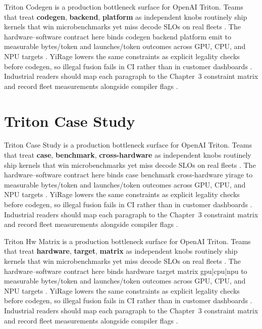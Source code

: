 Triton Codegen is a production bottleneck surface for OpenAI Triton. Teams that treat \textbf{codegen}, \textbf{backend}, \textbf{platform} as independent knobs routinely ship kernels that win microbenchmarks yet miss decode SLOs on real fleets \citep{nvidia2022hopper,amd2024aie}. The hardware--software contract here binds codegen backend platform emit to measurable bytes/token and launches/token outcomes across GPU, CPU, and NPU targets \citep{semianalysis2024tma,dlbook}. YiRage lowers the same constraints as explicit legality checks before codegen, so illegal fusion fails in CI rather than in customer dashboards \citep{amd2024xdna,dao2022flashattention}. Industrial readers should map each paragraph to the Chapter~3 constraint matrix and record fleet measurements alongside compiler flags \citep{amd2024aie,kwon2023vllm}.

\section{Triton Case Study}
\label{sec:triton_case_study}

Triton Case Study is a production bottleneck surface for OpenAI Triton. Teams that treat \textbf{case}, \textbf{benchmark}, \textbf{cross-hardware} as independent knobs routinely ship kernels that win microbenchmarks yet miss decode SLOs on real fleets \citep{semianalysis2024tma,dlbook}. The hardware--software contract here binds case benchmark cross-hardware yirage to measurable bytes/token and launches/token outcomes across GPU, CPU, and NPU targets \citep{amd2024xdna,dao2022flashattention}. YiRage lowers the same constraints as explicit legality checks before codegen, so illegal fusion fails in CI rather than in customer dashboards \citep{amd2024aie,kwon2023vllm}. Industrial readers should map each paragraph to the Chapter~3 constraint matrix and record fleet measurements alongside compiler flags \citep{dlbook,nvidia2024cudagraphs}.

Triton Hw Matrix is a production bottleneck surface for OpenAI Triton. Teams that treat \textbf{hardware}, \textbf{target}, \textbf{matrix} as independent knobs routinely ship kernels that win microbenchmarks yet miss decode SLOs on real fleets \citep{memoryfloor2026,amd2024xdna}. The hardware--software contract here binds hardware target matrix gpu|cpu|npu to measurable bytes/token and launches/token outcomes across GPU, CPU, and NPU targets \citep{nvidia2022hopper,amd2024aie}. YiRage lowers the same constraints as explicit legality checks before codegen, so illegal fusion fails in CI rather than in customer dashboards \citep{semianalysis2024tma,dlbook}. Industrial readers should map each paragraph to the Chapter~3 constraint matrix and record fleet measurements alongside compiler flags \citep{amd2024xdna,dao2022flashattention}.

